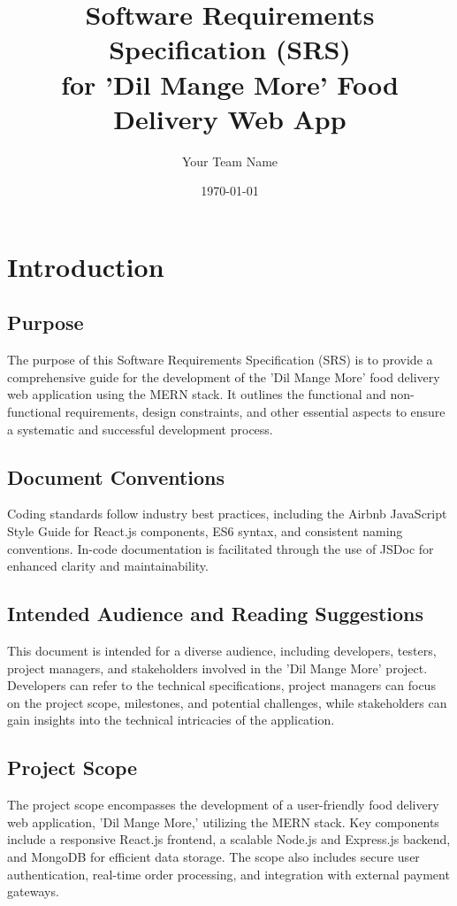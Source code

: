 \documentclass{article}
\title{Software Requirements Specification (SRS)\\[1ex]\large for 'Dil Mange More' Food Delivery Web App}
\author{Your Team Name}
\date{\today}
\begin{document}
\maketitle

\tableofcontents
\newpage

\section{Introduction}
\subsection{Purpose}
The purpose of this Software Requirements Specification (SRS) is to provide a comprehensive guide for the development of the 'Dil Mange More' food delivery web application using the MERN stack. It outlines the functional and non-functional requirements, design constraints, and other essential aspects to ensure a systematic and successful development process.

\subsection{Document Conventions}
Coding standards follow industry best practices, including the Airbnb JavaScript Style Guide for React.js components, ES6 syntax, and consistent naming conventions. In-code documentation is facilitated through the use of JSDoc for enhanced clarity and maintainability.

\subsection{Intended Audience and Reading Suggestions}
This document is intended for a diverse audience, including developers, testers, project managers, and stakeholders involved in the 'Dil Mange More' project. Developers can refer to the technical specifications, project managers can focus on the project scope, milestones, and potential challenges, while stakeholders can gain insights into the technical intricacies of the application.

\subsection{Project Scope}
The project scope encompasses the development of a user-friendly food delivery web application, 'Dil Mange More,' utilizing the MERN stack. Key components include a responsive React.js frontend, a scalable Node.js and Express.js backend, and MongoDB for efficient data storage. The scope also includes secure user authentication, real-time order processing, and integration with external payment gateways.
\end{document}
